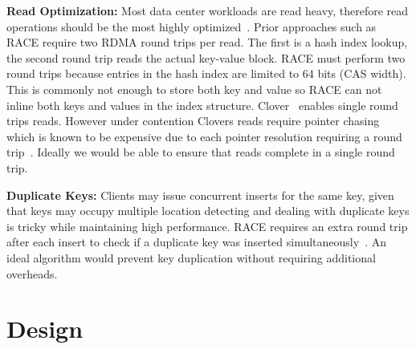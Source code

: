 \textbf{Read Optimization:} Most data center workloads are
read heavy, therefore read operations should be the most
highly optimized~\cite{datacenter-workloads,facebook-memcached}. Prior
approaches such as RACE require two RDMA round trips per
read. The first is a hash index lookup, the second round
trip reads the actual key-value block. RACE must perform two
round trips because entries in the hash index are limited to
64 bits (CAS width). This is commonly not enough to store
both key and value so RACE can not inline both keys and
values in the index structure. Clover~\cite{clover} enables
single round trips reads. However under contention Clovers
reads require pointer chasing which is known to be expensive
due to each pointer resolution requiring a round
trip~\cite{clio,clover,pointer-chaising}. Ideally we would
be able to ensure that reads complete in a single round
trip.

\textbf{Duplicate Keys:} Clients may issue concurrent
inserts for the same key, given that keys may occupy
multiple location detecting and dealing with duplicate keys
is tricky while maintaining high performance. RACE requires
an extra round trip after each insert to check if a
duplicate key was inserted simultaneously~\cite{race}. An
ideal algorithm would prevent key duplication without
requiring additional overheads.


\section{Design}
\label{sec:design}

